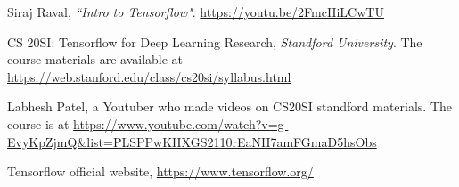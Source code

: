 \documentclass{article}
\begin{document}
	\begin{thebibliography}{50}
	
	 Siraj Raval, \emph{``Intro to Tensorflow"}.  \url{https://youtu.be/2FmcHiLCwTU}
	
	 CS 20SI: Tensorflow for Deep Learning Research, \emph{Standford University}. The course materials are available at \url{https://web.stanford.edu/class/cs20si/syllabus.html}
	
	 Labhesh Patel, a Youtuber who made videos on CS20SI standford materials. The course is at \url{https://www.youtube.com/watch?v=g-EvyKpZjmQ&list=PLSPPwKHXGS2110rEaNH7amFGmaD5hsObs}
	
	 Tensorflow official website, \url{https://www.tensorflow.org/}
	\end{thebibliography}
	
\end{document}
